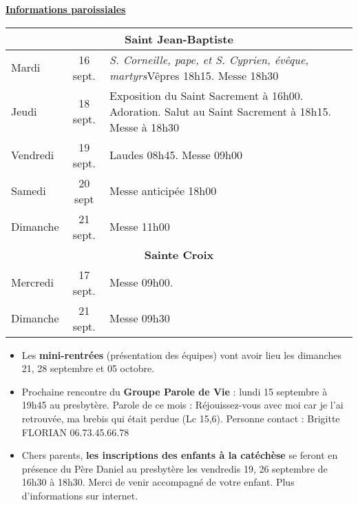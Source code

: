 \documentclass[french,11pt]{article}
\newcommand{\NewsItem}[1]{%
\vspace{3pt}
\underline{\textbf{#1}}
		  }
\begin{document}

\NewsItem{Informations paroissiales}

\begin{tabular} {lcp{9cm}}
\multicolumn{3}{c}{\textbf{Saint Jean-Baptiste} } \\ \hline
Mardi    & 16 sept.  &\emph{S. Corneille, pape, et S. Cyprien, évêque, martyrs}\newline  Vêpres 18h15. Messe 18h30 \\ \hline
Jeudi    & 18 sept. &
Exposition du Saint Sacrement à 16h00. Adoration. Salut au Saint Sacrement à 18h15. Messe à 18h30 
 \\ \hline
Vendredi & 19 sept. & Laudes 08h45. Messe 09h00 \\ \hline
Samedi   & 20 sept & Messe anticipée 18h00 \\ \hline
Dimanche  & 21 sept. & Messe 11h00\\ \hline
\multicolumn{3}{c}{\textbf{Sainte Croix} } \\ \hline
Mercredi & 17 sept.  & Messe 09h00. \\ \hline
Dimanche  & 21 sept. & Messe 09h30\\ \hline
\end{tabular}

\begin{framed}
\begin{itemize}
\item
Les \textbf{mini-rentrées} (présentation des équipes) vont avoir lieu les dimanches 21, 28 septembre et 05 octobre.
\item
Prochaine rencontre du \textbf{Groupe Parole de Vie} : lundi 15 septembre à 19h45 au presbytère.
Parole de ce mois : \og Réjouissez-vous avec moi car je l'ai retrouvée, ma brebis qui était perdue \fg{} (Lc 15,6).
Personne contact : Brigitte FLORIAN 06.73.45.66.78
\item
Chers parents,
\textbf{les inscriptions des enfants à la catéchèse} se feront en présence du Père Daniel au presbytère
les vendredis 19, 26 septembre de 16h30 à 18h30. Merci de venir accompagné de votre enfant.
Plus d'informations sur internet.
\end{itemize}
\end{framed}
\end{document}
